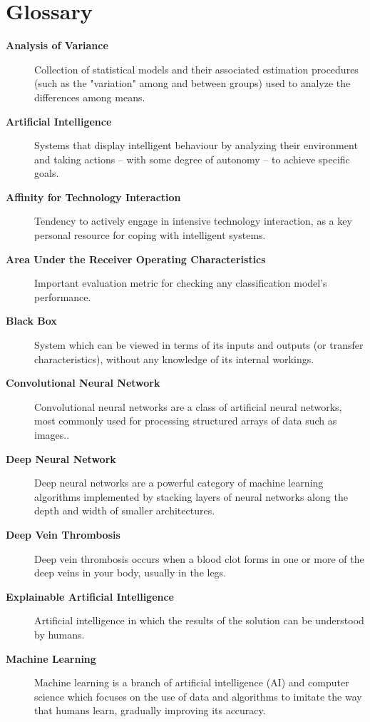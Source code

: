 {}
\chapter*{Glossary}
\begin{description}
    \item [\textbf{Analysis of Variance}] Collection of statistical models and their associated estimation procedures (such as the "variation" among and between groups) used to analyze the differences among means.
    \item [\textbf{Artificial Intelligence}] Systems that display intelligent behaviour by analyzing their environment and taking actions – with some degree of autonomy – to achieve specific goals.
    \item [\textbf{Affinity for Technology Interaction}] Tendency to actively engage in intensive technology interaction, as a key personal resource for coping with intelligent systems.
    \item [\textbf{Area Under the Receiver Operating Characteristics}] Important evaluation metric for checking any classification model’s performance.
    \item [\textbf{Black Box}] System which can be viewed in terms of its inputs and outputs (or transfer characteristics), without any knowledge of its internal workings.
    \item [\textbf{Convolutional Neural Network}] Convolutional neural networks are a class of artificial neural networks, most commonly used for processing structured arrays of data such as images..
    \item [\textbf{Deep Neural Network}] Deep neural networks are a powerful category of machine learning algorithms implemented by stacking layers of neural networks along the depth and width of smaller architectures.
    \item [\textbf{Deep Vein Thrombosis}] Deep vein thrombosis occurs when a blood clot forms in one or more of the deep veins in your body, usually in the legs.
    \item [\textbf{Explainable Artificial Intelligence}] Artificial intelligence in which the results of the solution can be understood by humans.
    \item [\textbf{Machine Learning}] Machine learning is a branch of artificial intelligence (AI) and computer science which focuses on the use of data and algorithms to imitate the way that humans learn, gradually improving its accuracy.
\end{description}
\clearpage

